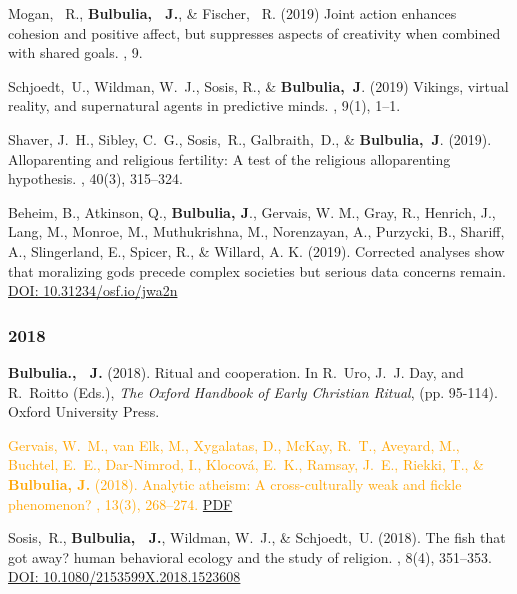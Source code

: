 \documentclass{article}
\begin{document}
\begin{thebibliography}{99}
Mogan, ~R., {\bf Bulbulia, ~J.}, \& Fischer, ~R. (2019)
\newblock Joint action enhances cohesion and positive affect, but suppresses aspects of creativity when combined with shared goals.
, 9.


Schjoedt,~U., Wildman, W.~J., Sosis, R., \& {\bf Bulbulia,~J}. (2019)
\newblock Vikings, virtual reality, and supernatural agents in predictive
  minds.
, 9(1), 1--1.


Shaver, J.~H., Sibley, C.~G., Sosis,~R., Galbraith,~D., \&  {\bf Bulbulia,~J}. (2019).
\newblock Alloparenting and religious fertility: A test of the religious
  alloparenting hypothesis.
, 40(3), 315--324. 


Beheim, B., Atkinson, Q., {\bf Bulbulia, J}., Gervais, W. M., Gray, R., Henrich, J., Lang, M., Monroe, M., Muthukrishna, M., Norenzayan, A., Purzycki, B., Shariff, A., Slingerland, E., Spicer, R., \& Willard, A. K. (2019).
\newblock Corrected analyses show that moralizing gods precede complex societies but serious data concerns remain. 
\href{https://doi.org/10.31234/osf.io/jwa2n}{DOI: 10.31234/osf.io/jwa2n}


\subsubsection*{2018}
{\bf Bulbulia., ~J.} (2018).
\newblock Ritual and cooperation.
\newblock In R.~Uro, J.~J. Day, and R.~Roitto (Eds.), {\em The Oxford
  Handbook of Early Christian Ritual}, (pp. 95-114). Oxford University Press. 


\textcolor{Orange}{Gervais, W.~M., van Elk, M., Xygalatas, D., McKay, R.~T., Aveyard, M., Buchtel,
  E.~E., Dar-Nimrod, I., Klocov{\'a}, E.~K., Ramsay, J.~E., Riekki, T., \& {\bf Bulbulia, J.} (2018).
\newblock Analytic atheism: A cross-culturally weak and fickle phenomenon?
, 13(3), 268--274.}
\href{https://www.dropbox.com/s/0sltfq9mtgzqlxm/Gervaisetal.2018AnalyticAtheism.pdf?dl=0}{PDF}%


Sosis,~R., {\bf Bulbulia, ~J.}, Wildman, W.~J., \& Schjoedt,~U. (2018).
\newblock The fish that got away? human behavioral ecology and the study of religion. 
, 8(4), 351--353. 
\href{https://doi.org/10.1080/2153599X.2018.1523608}{DOI: 10.1080/2153599X.2018.1523608}



\end{thebibliography}
\end{document}

